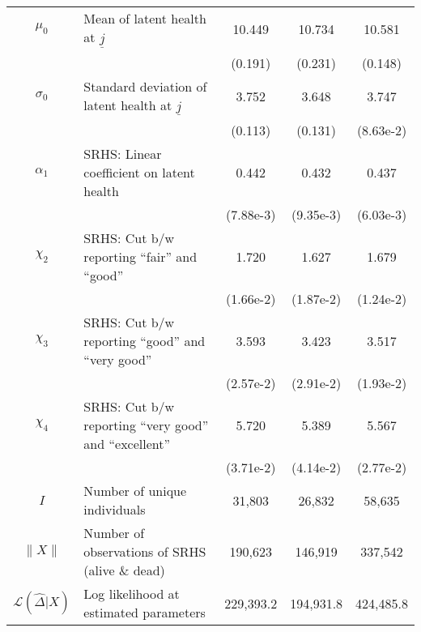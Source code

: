 \begin{table}
\begin{center}
{\begin{tabular}{clccc}
\hline
\rule{0pt}{2.2ex}$\mu_0$ & Mean of latent health at $\underline{j}$ & 10.449 & 10.734 & 10.581 \\
\rule{0pt}{2.2ex} & & (0.191) & (0.231) & (0.148) \\
\rule{0pt}{2.2ex}$\sigma_{0}$ & Standard deviation of latent health at $\underline{j}$ & 3.752 & 3.648 & 3.747 \\
\rule{0pt}{2.2ex} & & (0.113) & (0.131) & (8.63e-2) \\
\hline
\rule{0pt}{2.2ex}$\alpha_1$ & SRHS: Linear coefficient on latent health & 0.442 & 0.432 & 0.437 \\
\rule{0pt}{2.2ex} & & (7.88e-3) & (9.35e-3) & (6.03e-3) \\
\rule{0pt}{2.2ex}$\chi_2$ & SRHS: Cut b/w reporting ``fair'' and ``good'' & 1.720 & 1.627 & 1.679 \\
\rule{0pt}{2.2ex} & & (1.66e-2) & (1.87e-2) & (1.24e-2) \\
\rule{0pt}{2.2ex}$\chi_3$ & SRHS: Cut b/w reporting ``good'' and ``very good'' & 3.593 & 3.423 & 3.517 \\
\rule{0pt}{2.2ex} & & (2.57e-2) & (2.91e-2) & (1.93e-2) \\
\rule{0pt}{2.2ex}$\chi_4$ & SRHS: Cut b/w reporting ``very good'' and ``excellent'' & 5.720 & 5.389 & 5.567 \\
\rule{0pt}{2.2ex} & & (3.71e-2) & (4.14e-2) & (2.77e-2) \\
\hline
\rule{0pt}{2.2ex}$I$ & Number of unique individuals & 31,803 & 26,832 & 58,635\\
\rule{0pt}{2.2ex}$\lVert X \rVert$ & Number of observations of SRHS (alive \& dead) & 190,623 & 146,919 & 337,542\\
\rule{0pt}{2.2ex}$\mathcal{L}(\widehat{\Delta} | X)$ & Log likelihood at estimated parameters & 229,393.2 & 194,931.8 & 424,485.8\\
\hline\hline
\end{tabular}
 } 
\usebox{\BasicTableBox}  
\end{center}
\end{table}
